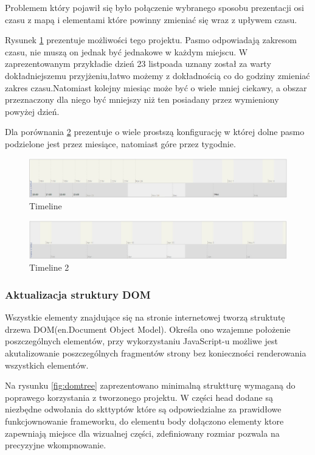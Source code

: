 Problemem który pojawił się było połączenie wybranego sposobu prezentacji osi czasu z mapą i elementami które powinny zmieniać się wraz z upływem czasu.

Rysunek \ref{fig:tm1} prezentuje możliwości tego projektu. Pasmo odpowiadają zakresom czasu, nie muszą on jednak być jednakowe w każdym miejscu. W zaprezentowanym przykładie dzień 23 listpoada uznany został za warty dokładniejszemu przyjżeniu,łatwo możemy z dokładnością co do godziny zmieniać zakres czasu.Natomiast kolejny miesiąc może być o wiele mniej ciekawy, a obszar przeznaczony dla niego być mniejszy niż ten posiadany przez wymieniony powyżej dzień.

Dla porównania \ref{fig:tm2} prezentuje o wiele prostszą konfigurację w której dolne pasmo podzielone jest przez miesiące, natomiast góre przez tygodnie.

  \begin{figure}[H]
  \centering
    \includegraphics[width=150mm]{ge/tm1.jpg}
  \caption{Timeline}
  \label{fig:tm1}
\end{figure}

  \begin{figure}[H]
  \centering
    \includegraphics[width=150mm]{ge/tm2.jpg}
  \caption{Timeline 2}
  \label{fig:tm2}
\end{figure}

\subsubsection{Aktualizacja struktury DOM}
\label{subsubsec:dom}

Wszystkie elementy znajdujące się na stronie internetowej tworzą struktutę drzewa DOM(en.Document Object Model). Określa ono wzajemne położenie poszczególnych elementów, przy wykorzystaniu JavaScript-u możliwe jest akutalizowanie poszczególnych fragmentów strony bez konieczności renderowania wszystkich elementów.

Na rysunku \ref{fig:domtree} zaprezentowano minimalną struktturę wymaganą do poprawego korzystania z tworzonego projektu. W części head dodane są niezbędne odwołania do skttyptów które są odpowiedzialne za prawidłowe funkcjownowanie frameworku, do elementu body dołączono elementy ktore zapewniają miejsce dla wizualnej części, zdefiniowany rozmiar pozwala na precyzyjne wkompnowanie.

